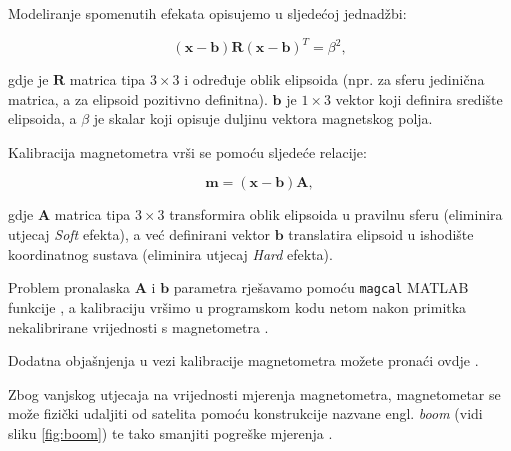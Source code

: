 \documentclass[times, utf8, diplomski, numeric]{templates/template}
\begin{document}
{{{{                Modeliranje spomenutih efekata opisujemo u sljedećoj jednadžbi:

                \begin{equation}
                    (\boldsymbol{x} - \boldsymbol{b}) \boldsymbol{R} (\boldsymbol{x} - \boldsymbol{b})^T = \beta^2,
                \end{equation}

                gdje je $\boldsymbol{R}$ matrica tipa $3\times3$ i određuje oblik elipsoida (npr. za sferu jedinična matrica, a za elipsoid pozitivno definitna). $\boldsymbol{b}$ je $1\times3$ vektor koji definira središte elipsoida, a $\beta$ je skalar koji opisuje duljinu vektora magnetskog polja. 

                Kalibracija magnetometra vrši se pomoću sljedeće relacije:

                \begin{equation}
                    \boldsymbol{m} = (\boldsymbol{x} - \boldsymbol{b}) \boldsymbol{A},
                \end{equation}

                gdje $\boldsymbol{A}$ matrica tipa $3\times3$ transformira oblik elipsoida u pravilnu sferu (eliminira utjecaj \emph{Soft} efekta), a već definirani vektor $\boldsymbol{b}$ translatira elipsoid u ishodište koordinatnog sustava (eliminira utjecaj \emph{Hard} efekta).

                Problem pronalaska $\boldsymbol{A}$ i $\boldsymbol{b}$ parametra rješavamo pomoću \texttt{magcal} MATLAB funkcije \cite{magcal}, a kalibraciju vršimo u programskom kodu netom nakon primitka nekalibrirane vrijednosti s magnetometra \cite{kalibracijaMagKod}.

                Dodatna objašnjenja u vezi kalibracije magnetometra možete pronaći ovdje \cite{kalibracijaMatlabStranica}.

                Zbog vanjskog utjecaja na vrijednosti mjerenja magnetometra, magnetometar se može fizički udaljiti od satelita pomoću konstrukcije nazvane engl. \emph{boom} (vidi sliku \ref{fig:boom}) te tako smanjiti pogreške mjerenja \cite{adcsKnjiga}. 

}}}}
\end{document}
